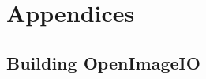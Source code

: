 \documentclass[11pt,letterpaper]{book}
\begin{document}







\part{Appendices}
\begin{appendix}

%
\chapter{Building OpenImageIO}




%

\end{appendix}

\backmatter

%

\printindex
\end{document}
